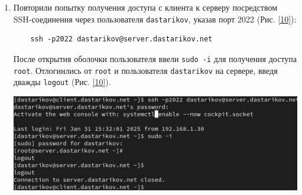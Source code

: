 \begin{enumerate}
\item Повторили попытку получения доступа с клиента к серверу посредством SSH-соединения через пользователя \texttt{dastarikov}, указав порт 2022 (Рис. \ref{10}):
  \begin{verbatim}
    ssh -p2022 dastarikov@server.dastarikov.net
  \end{verbatim}
  После открытия оболочки пользователя ввели \texttt{sudo -i} для получения доступа \texttt{root}. Отлогинлись от \texttt{root} и пользователя \texttt{dastarikov} на сервере, введя дважды \texttt{logout} (Рис. \ref{10}).
\begin{center}
  \centering
  \includegraphics[width=\textwidth]{../images/image10.png}
  \label{10}
\end{center}
\end{enumerate}

